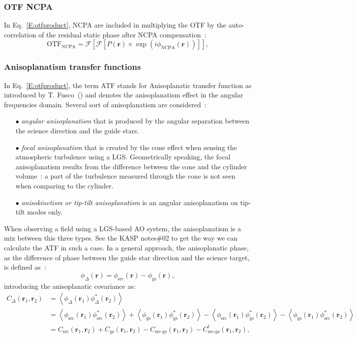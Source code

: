 \documentclass[12pt]{article}
\newcommand{\para}[1]{\left(#1\right)}
\newcommand{\cro}[1]{\left[#1\right]}
\newcommand{\aver}[1]{\left\langle #1 \right\rangle}
\newcommand{\rbb}{\boldsymbol{r}}
\newcommand{\rbun}{\boldsymbol{r}_1}
\newcommand{\rbdeux}{\boldsymbol{r}_2}
\newcommand{\otf}[1]{\text{OTF}_{#1}}
\begin{document}
\subsubsection{OTF NCPA}
In Eq.~\ref{E:otfproduct}, NCPA are included in multiplying the OTF by the auto-correlation of the residual static phase after NCPA compensation~:
\begin{equation}
\otf{\text{NCPA}} = \mathcal{F}\cro{\mathcal{F}\cro{P(\rbb)\times\exp\para{i\phi_\text{NCPA}(\rbb)}}},
\end{equation}

\subsubsection{Anisoplanatism transfer functions}

In Eq.~\ref{E:otfproduct}, the term ATF stands for Anisoplanatic transfer function as introduced by T. Fusco~(\cite{Fusco2000}) and denotes the anisoplanatism effect in the angular frequencies domain. Several sort of anisoplanatism are considered~:
\begin{itemize}
	\item[$\bullet$] \emph{angular anisoplanatism} that is produced by the angular separation between the science direction and the guide stars. 
	\item[$\bullet$] \emph{focal anisoplanatism} that is created by the cone effect when sensing the atmospheric turbulence using a LGS. Geometrically speaking, the focal anisoplanatism results from the difference between the cone and the cylinder volume~: a part of the turbulence measured through the cone is not seen when comparing to the cylinder.
	\item[$\bullet$] \emph{anisokinetism or tip-tilt anisoplanatism} is an angular anisoplanatism on tip-tilt modes only.
\end{itemize}

When observing a field using a LGS-based AO system, the anisoplanatism is a mix between this three types. See the KASP notes\#02 to get the way we can calculate the ATF in such a case. In a general approach, the anisoplanatic phase, as the difference of phase between the guide star direction and the science target, is defined as~:
\begin{equation}
\phi_\Delta(\rbb) = \phi_\text{src}(\rbb) - \phi_\text{gs}(\rbb),
\end{equation}
introducing the anisoplanatic covariance as:
\begin{equation} \label{E:cov}
\begin{aligned}
C_\Delta(\rbun,\rbdeux) &= \aver{\phi_\Delta(\rbun)\phi^*_\Delta(\rbdeux)}\\
&=  \aver{\phi_\text{src}(\rbun)\phi^*_\text{src}(\rbdeux)} + \aver{\phi_\text{gs}(\rbun)\phi^*_\text{gs}(\rbdeux)} - \aver{\phi_\text{src}(\rbun)\phi^*_\text{gs}(\rbdeux)}- \aver{\phi_\text{gs}(\rbun)\phi^*_\text{src}(\rbdeux)}\\ 
&= C_\text{src}(\rbun,\rbdeux) + C_\text{gs}(\rbun,\rbdeux) - C_\text{src-gs}(\rbun,\rbdeux) - C^t_\text{src-gs}(\rbun,\rbdeux),
\end{aligned}
\end{equation}
\end{document}
